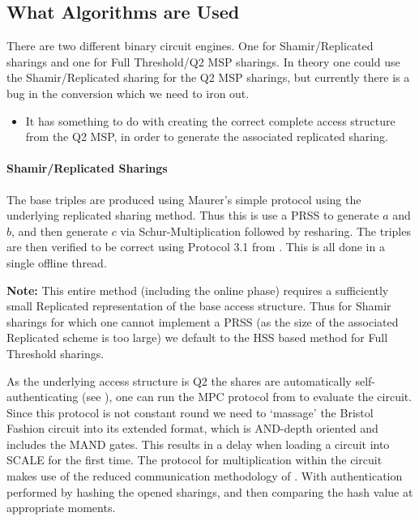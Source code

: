 \subsection{What Algorithms are Used}
There are two different binary circuit engines. One for Shamir/Replicated
sharings and one for Full Threshold/Q2 MSP sharings.
In theory one could use the Shamir/Replicated sharing for the Q2 MSP
sharings, but currently there is a bug in the conversion which we need
to iron out.
\begin{itemize}
\item It has something to do with creating the correct complete access
structure from the Q2 MSP, in order to generate the associated
replicated sharing.
\end{itemize}

\paragraph{Shamir/Replicated Sharings}
The base triples are produced using Maurer's simple protocol
\cite{Maurer} using the underlying replicated sharing method.
Thus this is use a PRSS to generate 
$a$ and $b$, and then generate $c$ via Schur-Multiplication
followed by resharing.
The triples are then verified to be correct using Protocol 3.1
from \cite{DBLP:conf/sp/ArakiBFLLNOWW17}.
This is all done in a single offline thread.

{\bf Note:} This entire method (including the online phase)
requires a sufficiently small Replicated representation of 
the base access structure. Thus for Shamir sharings for which 
one cannot implement a PRSS (as the size of the associated 
Replicated scheme is too large) we default to the HSS based
method for Full Threshold sharings. 

As the underlying access structure is Q2 the shares are automatically
self-authenticating (see \cite{SW18}), one can run the 
MPC protocol from \cite{SW18} to evaluate the circuit.
Since this protocol is not constant round we need to `massage'
the Bristol Fashion circuit into its extended format, which
is AND-depth oriented and includes the MAND gates. This
results in a delay when loading a circuit into SCALE for the
first time.
The protocol for multiplication within the circuit
makes use of the reduced communication methodology of
\cite{KRSW}.
With authentication performed by hashing the opened sharings,
and then comparing the hash value at appropriate moments.

